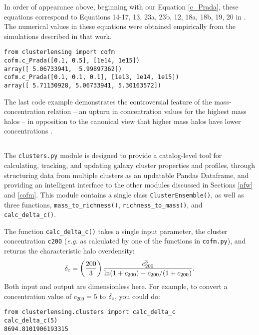 \documentclass[twocolumn]{aastex6}
\newcommand{\code}{\lstinline[style=codeintext]}
\newcommand{\hcode}{\large\normalfont\texttt} %
\begin{document}
In order of appearance above, beginning with our Equation \ref{c_Prada}, these equations correspond to Equations 14-17, 13, 23a, 23b, 12, 18a, 18b, 19, 20 in \citet{Prada12}. The numerical values in these equations were obtained empirically from the simulations described in that work.
\begin{lstlisting}
from clusterlensing import cofm
cofm.c_Prada([0.1, 0.5], [1e14, 1e15])
array([ 5.06733941,  5.99897362])
cofm.c_Prada([0.1, 0.1, 0.1], [1e13, 1e14, 1e15])
array([ 5.71130928, 5.06733941, 5.30163572])
\end{lstlisting}
The last code example demonstrates the controversial feature of the \citet{Prada12} mass-concentration relation -- an upturn in concentration values for the highest mass halos -- in opposition to the canonical view that higher mass halos have lower concentrations \citep{nfw96, nfw97, Jing00, Bullock01}.


\subsection{\normalfont{\hcode{clusters.py}}}
\label{clusters}
The \code{clusters.py} module is designed to provide a catalog-level tool for calculating, tracking, and updating galaxy cluster properties and profiles, through structuring data from multiple clusters as an updatable Pandas Dataframe, and providing an intelligent interface to the other modules discussed in Sections \ref{nfw} and \ref{cofm}. This module contains a single class \code{ClusterEnsemble()}, as well as three functions, \code{mass_to_richness()}, \code{richness_to_mass()}, and \code{calc_delta_c()}.

The function \code{calc_delta_c()} takes a single input parameter, the cluster concentration \code{c200} (\emph{e.g.} as calculated by one of the functions in \code{cofm.py}), and returns the characteristic halo overdensity:
\begin{equation}
\delta_{\rm c} = \left( \frac{200}{3} \right) \frac{c_{200}^3}{\ln(1 + c_{200}) - c_{200}/(1 + c_{200})}.
\end{equation}
Both input and output are dimensionless here. For example, to convert a concentration value of $c_{200} = 5$ to $\delta_{\rm c}$, you could do:
\begin{lstlisting}
from clusterlensing.clusters import calc_delta_c
calc_delta_c(5)
8694.8101906193315
\end{lstlisting}
\end{document}
